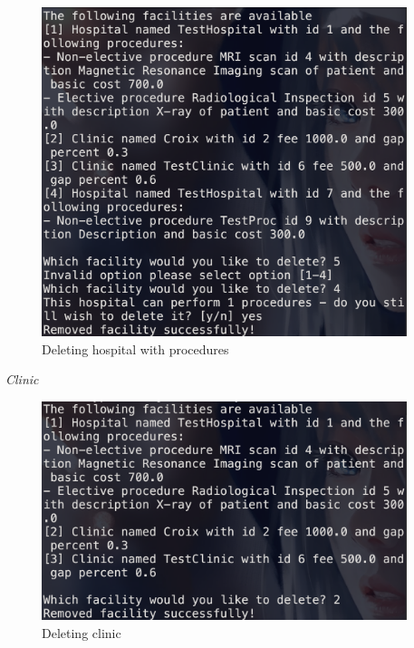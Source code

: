\documentclass{article}
\begin{document}
	\begin{figure}
		\begin{center}
			\includegraphics[width=0.95\textwidth]{figures/Deleting/Deleting_Hospital_02.png}
		\end{center}
		\caption{Deleting hospital with procedures}\label{fig:deleting_hospital_02}
	\end{figure}
	
	\textit{Clinic}
	\begin{figure}
		\begin{center}
			\includegraphics[width=0.95\textwidth]{figures/Deleting/Deleting_Clinic_02.png}
		\end{center}
		\caption{Deleting clinic}\label{fig:deleting_clinic_02}
	\end{figure}
	
\end{document}

